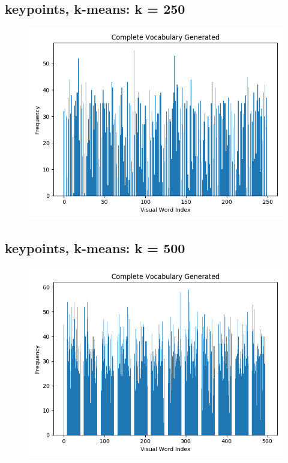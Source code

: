 \subsection*{keypoints, k-means: k = 250}
\begin{figure}[H]
    \centering
    \includegraphics[scale = 0.5]{images/bow-kp-250.png}
\end{figure}

\subsection*{keypoints, k-means: k = 500}
\begin{figure}[H]
    \centering
    \includegraphics[scale = 0.5]{images/bow-kp-500.png}
\end{figure}

